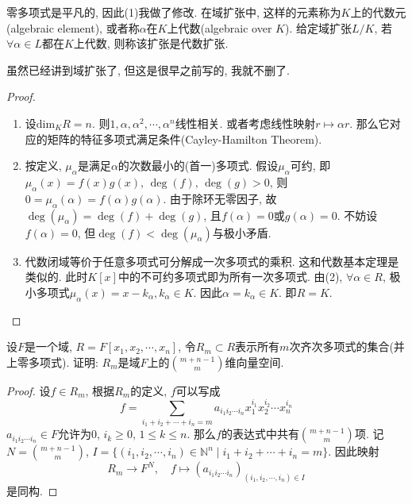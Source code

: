 \documentclass{../solutions-cn}
\begin{document}
\begin{remark}
    零多项式是平凡的, 因此(1)我做了修改. 在域扩张中, 这样的元素称为$K$上的代数元(algebraic element), 或者称$\alpha$在$K$上代数(algebraic over $K$). 给定域扩张$L/K$, 若$\forall \alpha \in L$都在$K$上代数, 则称该扩张是代数扩张.

    虽然已经讲到域扩张了, 但这是很早之前写的, 我就不删了.
\end{remark}

\begin{proof}
    \begin{enumerate}[(1)]
        \item 设$\mathrm{dim}_K R = n$. 则$1, \alpha, \alpha^2, \cdots, \alpha^n$线性相关. 或者考虑线性映射$r \mapsto \alpha r$. 那么它对应的矩阵的特征多项式满足条件(Cayley-Hamilton Theorem).
        \item 按定义, $\mu_\alpha$是满足$\alpha$的次数最小的(首一)多项式. 假设$\mu_\alpha$可约, 即$\mu_\alpha(x) = f(x)g(x),\, \deg(f),\, \deg(g)> 0$, 则$0 = \mu_\alpha(\alpha) = f(\alpha)g(\alpha)$. 由于除环无零因子, 故$\deg(\mu_\alpha) = \deg(f) + \deg(g)$, 且$f(\alpha) = 0$或$g(\alpha) = 0$. 不妨设$f(\alpha) = 0$, 但$\deg(f) < \deg (\mu_\alpha)$与极小矛盾.
        \item 代数闭域等价于任意多项式可分解成一次多项式的乘积. 这和代数基本定理是类似的. 此时$K[x]$中的不可约多项式即为所有一次多项式. 由(2), $\forall \alpha \in R$, 极小多项式$\mu_\alpha(x) = x - k_\alpha, k_\alpha \in K$. 因此$\alpha = k_\alpha \in K$. 即$R = K$.
    \end{enumerate}
\end{proof}

\begin{exercise}[习题2.4.1]
    设$F$是一个域, $R = F[x_1, x_2, \cdots, x_n]$, 令$R_m \subset R$表示所有$m$次齐次多项式的集合(并上零多项式). 证明: $R_m$是域$F$上的$\binom{m + n - 1}{m}$维向量空间.
\end{exercise}

\begin{proof}
    设$f \in R_m$, 根据$R_m$的定义, $f$可以写成
    \[
        f = \sum_{i_1 + i_2 + \cdots + i_n = m} a_{i_1i_2 \cdots i_n}x_1^{i_1}x_2^{i_2} \cdots x_n^{i_n}
    \]
    $a_{i_1i_2 \cdots i_n} \in F$允许为$0$, $i_k \geqslant 0,\, 1 \leqslant k \leqslant n$. 那么$f$的表达式中共有$\binom{m + n - 1}{m}$项. 记$N = \binom{m + n - 1}{m}$, $I = \{(i_1, i_2, \cdots, i_n) \in \mathbb{N}^n \mid i_1 + i_2 + \cdots + i_n = m\}$. 因此映射
    \[
        R_m \to F^{N},\quad f \mapsto (a_{i_1i_2 \cdots i_n})_{(i_1, i_2, \cdots, i_n) \in I}
    \]
    是同构.
\end{proof}
\end{document}
